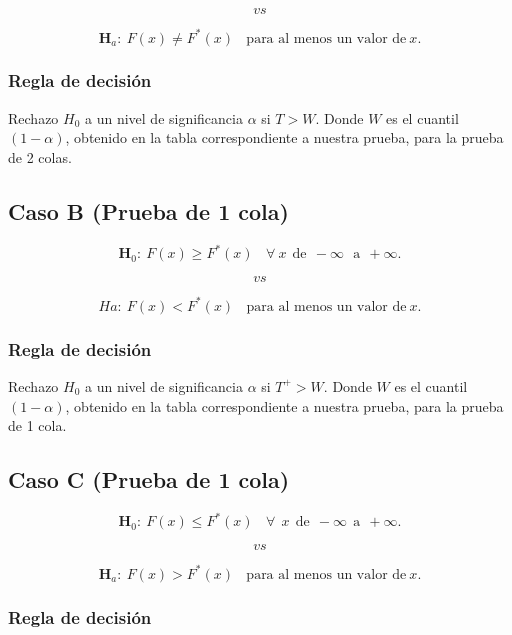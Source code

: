 \documentclass[
  a4paper,
  oneside,
  openany]{book}
\begin{document}
\[vs\]

\[\textbf{H}_a: \ F(x) \neq F^*(x) \ \ \ \ \mbox{para al menos un  valor de} \   x.\]

\hypertarget{regla-de-decisiuxf3n-27}{%
\subsubsection*{Regla de decisión}\label{regla-de-decisiuxf3n-27}}


Rechazo \(H_0\) a un nivel de significancia \(\alpha\) si \(T>W\). Donde \(W\) es el cuantil \((1-\alpha)\), obtenido en la tabla correspondiente a nuestra prueba, para la prueba de 2 colas.

\hypertarget{caso-b-prueba-de-1-cola-1}{%
\subsection*{Caso B (Prueba de 1 cola)}\label{caso-b-prueba-de-1-cola-1}}


\[\textbf{H}_0: \ F(x) \geq F^*(x) \ \ \ \ \forall\ x\ \ \mbox{de} \ \ -\infty \  \ \  \mbox{a} \ \ +\infty.\]

\[vs\]

\[Ha: \ F(x) < F^*(x) \ \ \ \ \mbox{para al menos un valor de} \  x.\]

\hypertarget{regla-de-decisiuxf3n-28}{%
\subsubsection*{Regla de decisión}\label{regla-de-decisiuxf3n-28}}


Rechazo \(H_0\) a un nivel de significancia \(\alpha\) si \(T^+>W\). Donde \(W\) es el cuantil \((1-\alpha)\), obtenido en la tabla correspondiente a nuestra prueba, para la prueba de 1 cola.

\hypertarget{caso-c-prueba-de-1-cola-1}{%
\subsection*{Caso C (Prueba de 1 cola)}\label{caso-c-prueba-de-1-cola-1}}


\[\textbf{H}_0:\ F(x) \leq F^*(x) \ \ \ \ \forall \ \ x \ \  \mbox{de} \  \ -\infty \ \  \mbox{a} \ \  +\infty.\]

\[vs\]

\[\textbf{H}_a: \ F(x) > F^*(x) \ \ \ \ \mbox{para al menos un valor de} \  x.\]

\hypertarget{regla-de-decisiuxf3n-29}{%
\subsubsection*{Regla de decisión}\label{regla-de-decisiuxf3n-29}}
\end{document}
